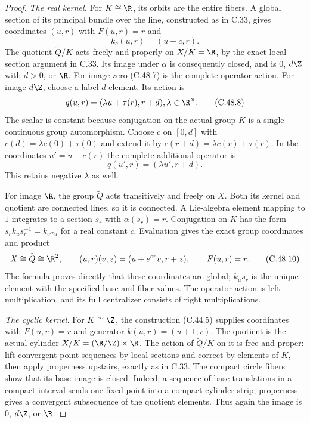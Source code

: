 \begin{proof}
\emph{The real kernel.}
For $K\cong\R$, its orbits are the entire fibers. A global
section of its principal bundle over the line, constructed
as in C.33, gives coordinates $(u,r)$ with $F(u,r)=r$ and
\[
                         k_c(u,r)=(u+c,r).              \tag{C.48.7}
\]
The quotient $\widetilde Q/K$ acts freely and properly on
$X/K=\R$, by the exact local-section argument in C.33.
Its image under $\alpha$ is consequently closed, and is
$0$, $d\Z$ with $d>0$, or $\R$.
For image zero (C.48.7) is the complete operator action.
For image $d\Z$, choose a label-$d$ element. Its action is
\[
                 q(u,r)=(\lambda u+\tau(r),r+d),
                         \lambda\in\R^\times.          \tag{C.48.8}
\]
The scalar is constant because conjugation on the actual
group $K$ is a single continuous group automorphism.
Choose $c$ on $[0,d]$ with
$c(d)=\lambda c(0)+\tau(0)$ and extend it by
$c(r+d)=\lambda c(r)+\tau(r)$. In the coordinates
$u'=u-c(r)$ the complete additional operator is
\[
                         q(u',r)=(\lambda u',r+d).
                                                        \tag{C.48.9}
\]
This retains negative $\lambda$ as well.

For image $\R$, the group $\widetilde Q$ acts transitively
and freely on $X$. Both its kernel and quotient are
connected lines, so it is connected. A Lie-algebra element
mapping to $1$ integrates to a section $s_r$ with
$\alpha(s_r)=r$. Conjugation on $K$ has the form
$s_rk_us_r^{-1}=k_{e^{cr}u}$ for a real constant $c$.
Evaluation gives the exact group coordinates and product
\[
 X\cong\widetilde Q\cong\R^2,\qquad
 (u,r)(v,z)=(u+e^{cr}v,r+z),\qquad F(u,r)=r.
                                                        \tag{C.48.10}
\]
The formula proves directly that these coordinates are
global; $k_us_r$ is the unique element with the specified
base and fiber values. The operator action is left
multiplication, and its full centralizer consists of
right multiplications.

\emph{The cyclic kernel.}
For $K\cong\Z$, the construction (C.44.5) supplies
coordinates with $F(u,r)=r$ and generator
$k(u,r)=(u+1,r)$. The quotient is the actual cylinder
$X/K=(\R/\Z)\times\R$. The action of
$\widetilde Q/K$ on it is free and proper: lift convergent
point sequences by local sections and correct by elements
of $K$, then apply properness upstairs, exactly as in
C.33. The compact circle fibers show that its base image
is closed. Indeed, a sequence of base translations in a
compact interval sends one fixed point into a compact
cylinder strip; properness gives a convergent subsequence
of the quotient elements. Thus again the image is
$0$, $d\Z$, or $\R$.


\end{proof}
